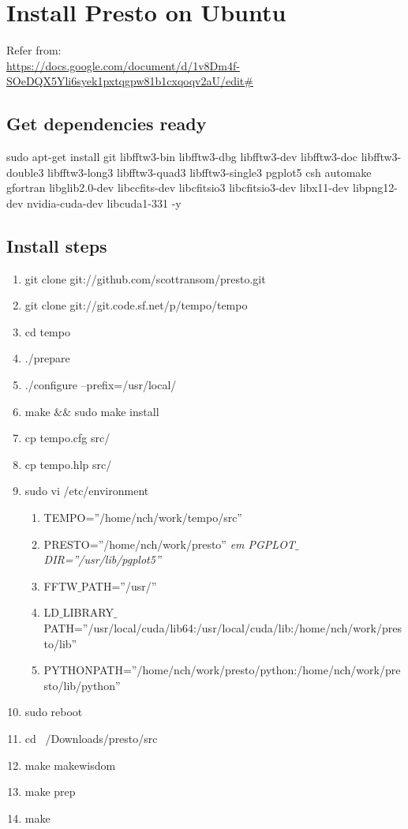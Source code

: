 \documentclass{article}
\begin{document}
\section{Install Presto on Ubuntu}
Refer from:\\
 \url{https://docs.google.com/document/d/1v8Dm4f-SOeDQX5Yli6syek1pxtqgpw81b1cxqoqv2aU/edit#} \\
 
\subsection{Get dependencies ready}
sudo apt-get install git libfftw3-bin libfftw3-dbg libfftw3-dev libfftw3-doc libfftw3-double3 libfftw3-long3 libfftw3-quad3 libfftw3-single3 pgplot5 csh automake gfortran libglib2.0-dev libccfits-dev libcfitsio3 libcfitsio3-dev libx11-dev libpng12-dev nvidia-cuda-dev libcuda1-331 -y
\subsection{Install steps}
\begin{enumerate}[Step 1)]
\item git clone git://github.com/scottransom/presto.git
\item git clone git://git.code.sf.net/p/tempo/tempo
\item cd tempo
\item ./prepare
\item ./configure --prefix=/usr/local/
\item make $\&\&$ sudo make install
\item cp tempo.cfg src/
\item cp tempo.hlp src/
\item sudo vi /etc/environment
		\begin{enumerate}[*]
		\item TEMPO=”/home/nch/work/tempo/src”
		\item PRESTO=”/home/nch/work/presto”
		\it	em PGPLOT$\_$DIR=”/usr/lib/pgplot5”
		\item FFTW$\_$PATH=”/usr/”
		\item LD$\_$LIBRARY$\_$PATH=”/usr/local/cuda/lib64:/usr/local/cuda/lib:/home/nch/work/presto/lib”
		\item PYTHONPATH=”/home/nch/work/presto/python:/home/nch/work/presto/lib/python”
		\end{enumerate}
\item sudo reboot
\item cd ~/Downloads/presto/src
\item make makewisdom
\item make prep
\item make 
\end{enumerate}
\end{document}
